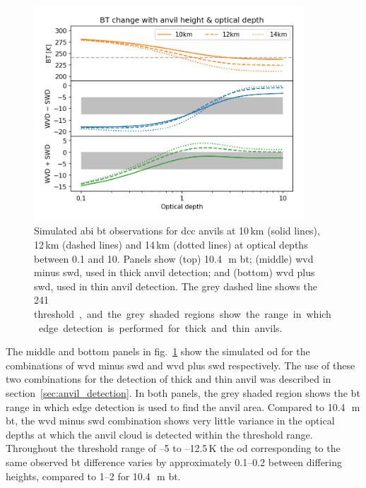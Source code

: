 \begin{figure}[tp]
    \centering
    \includegraphics[width=0.9\textwidth]{figures/chapter3_01.png}
    \caption[
    Simulated \acrshort{abi} \acrshort{bt} observations of \acrshort{dcc} anvils at a range of heights and optical depths.
    ]{
    Simulated \acrshort{abi} \acrshort{bt} observations for \acrshort{dcc} anvils at 10\,\unit{km} (solid lines), 12\,\unit{km} (dashed lines) and 14\,\unit{km} (dotted lines) at optical depths between 0.1 and 10. Panels show (top) 10.4\,\unit{\mu m} \acrshort{bt}; (middle) \acrshort{wvd} minus \acrshort{swd}, used in thick anvil detection; and (bottom) \acrshort{wvd} plus \acrshort{swd}, used in thin anvil detection. The grey dashed line shows the 241\,\unit[K] threshold, and the grey shaded regions show the range in which edge detection is performed for thick and thin anvils.
    }
    \label{fig:bt_wvd_swd_height_od}
\end{figure}

The middle and bottom panels in fig.~\ref{fig:bt_wvd_swd_height_od} show the simulated \acrshort{od} for the combinations of \acrshort{wvd} minus \acrshort{swd} and \acrshort{wvd} plus \acrshort{swd} respectively.
The use of these two combinations for the detection of thick and thin anvil was described in section~\ref{sec:anvil_detection}.
In both panels, the grey shaded region shows the \acrshort{bt} range in which edge detection is used to find the anvil area.
Compared to 10.4\,\unit{\mu m} \acrshort{bt}, the \acrshort{wvd} minus \acrshort{swd} combination shows very little variance in the optical depths at which the anvil cloud is detected within the threshold range.
Throughout the threshold range of --5 to --12.5\,\unit{K} the \acrshort{od} corresponding to the same observed \acrshort{bt} difference varies by approximately 0.1--0.2 between differing heights, compared to 1--2 for 10.4\,\unit{\mu m} \acrshort{bt}.

